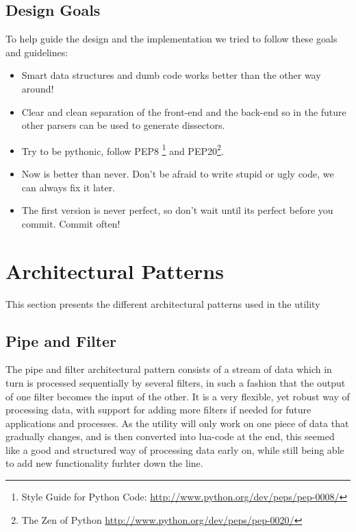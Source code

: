 \subsection{Design Goals}
To help guide the design and the implementation we tried to follow these goals and guidelines:
\begin{itemize}
	\item Smart data structures and dumb code works better than the other way around\cite{Raymond1999}!
	\item Clear and clean separation of the front-end and the back-end so in the future other parsers can be used to generate \glspl{dissector}.
	\item Try to be pythonic, follow  PEP8 \footnote{Style Guide for Python Code: \url{http://www.python.org/dev/peps/pep-0008/}} and PEP20\footnote{The Zen of Python \url{http://www.python.org/dev/peps/pep-0020/}}.
	\item Now is better than never. Don't be afraid to write stupid or ugly code, we can always fix it later.
	\item The first version is never perfect, so don't wait until its perfect before you commit. Commit often!
\end{itemize}

\section{Architectural Patterns}
This section presents the different architectural patterns used in the \gls{utility}

\subsection{Pipe and Filter}
The pipe and filter architectural pattern consists of a stream of data which in turn is processed sequentially by several filters, in such a fashion that the output of one filter becomes the input of the other. It is a very flexible, yet robust way of processing data, with support for adding more filters if needed for future applications and processes. As the \gls{utility} will only work on one piece of data that gradually changes, and is then converted into \Gls{lua}-code at the end, this seemed like a good and structured way of processing data early on, while still being able to add new functionality furhter down the line.

